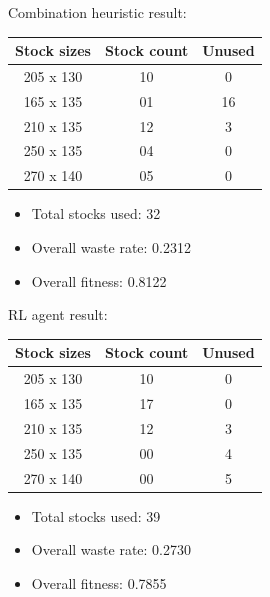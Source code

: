 \documentclass[a4paper]{article}
\begin{document}
    \begin{center}
    \begin{minipage}{0.45\textwidth}
        Combination heuristic result:\\
        
        \centering
        \begin{tabular}{|c|c|c|}
        \hline
        \rowcolor{gray!30} \textbf{Stock sizes} & \textbf{Stock count} & \textbf{Unused} \\ \hline
        205 x 130 & 10 & 0 \\ \hline
        165 x 135 & 01 & 16 \\ \hline
        210 x 135 & 12 & 3 \\ \hline
        250 x 135 & 04 & 0 \\ \hline
        270 x 140 & 05 & 0 \\ \hline
        \end{tabular}
        \centering
        \begin{itemize}
            \item Total stocks used: 32 
            \item Overall waste rate: 0.2312 
            \item Overall fitness: 0.8122
        \end{itemize}
    \end{minipage}
    \hfill
    \begin{minipage}{0.45\textwidth}
        RL agent result:\\
        
        \centering
        \begin{tabular}{|c|c|c|}
        \hline
        \rowcolor{gray!30} \textbf{Stock sizes} & \textbf{Stock count} & \textbf{Unused} \\ \hline
        205 x 130 & 10 & 0 \\ \hline
        165 x 135 & 17 & 0 \\ \hline
        210 x 135 & 12 & 3 \\ \hline
        250 x 135 & 00 & 4 \\ \hline
        270 x 140 & 00 & 5 \\ \hline
        \end{tabular}
        \centering
        \begin{itemize}
            \item Total stocks used: 39 
            \item Overall waste rate: 0.2730
            \item Overall fitness: 0.7855
        \end{itemize}
    \end{minipage}
    \end{center}
    \pagebreak
\end{document}
